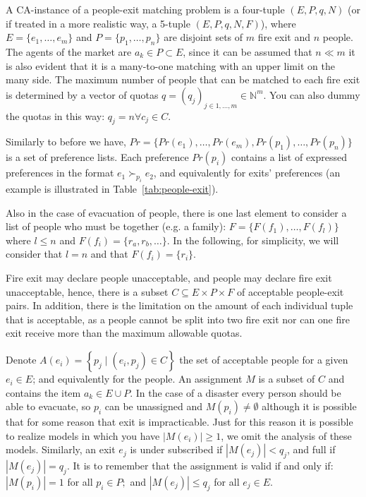 \documentclass[letterpaper]{article} %
\begin{document}
    A CA-instance of a people-exit matching problem is a four-tuple \((E, P, q, N)\)
    (or if treated in a more realistic way, a 5-tuple \((E, P, q, N, F)\)), where
    \(E = \{e_1, \dots, e_m\}\) and \(P = \{p_1, \dots,p_n\}\) are disjoint sets of \(m\) fire exit and \(n\) people.
    The agents of the market are \(a_k \in P\subset E\), since it can be assumed that \(n \ll m\) it is also evident
    that it is a many-to-one matching with an upper limit  on the many side.
    The maximum number of people that can be matched to
    each fire exit is determined by a vector of quotas \(q = (q_j)_{j\in {1,...,m}} \in \mathbb{N}^m\).
    You can also dummy the quotas in this way:  \(q_j = n \forall c_j \in C\).

    Similarly to before we have, \(Pr = \{Pr(e_1), \dots , Pr(e_m), Pr(p_1), \dots , Pr(p_n)\}\) is
    a set of preference lists.
    Each preference \(Pr(p_i)\) contains a list of expressed preferences in the format
    \( e _ { 1 } \succ_{p _ { i }} e _ { 2 } \), and equivalently for exits' preferences (an example is illustrated in Table~\ref{tab:people-exit}).

    Also in the case of evacuation of people, there is one last element to consider a list of people who must be together (e.g. a family):
    \(F=\{F(f_1), \dots, F(f_l)\}\) where \(l\leq n\) and \(F(f_i) = \{r_a, r_b, \dots\}\).
    In the following, for simplicity, we will consider that \(l=n\) and that \(F(f_i)=\{r_i\}\).

    Fire exit may declare people unacceptable, and people may declare fire exit unacceptable,
    hence, there is a subset \(C \subseteq E \times P \times F\) of acceptable people-exit pairs.
    In addition, there is the limitation on the amount of each individual tuple that is acceptable, as a people
    cannot be split into two fire exit nor can one fire exit receive more than the maximum allowable quotas.

    Denote \( A \left( e _ { i } \right) = \left\{ p _ { j } \mid \left( e _ { i } , p _ { j } \right) \in C \right\} \)
    the set of acceptable people for a given \( e _ { i } \in E \); and equivalently for the people.
    An assignment \(M\) is a subset of \(C\) and contains the item \( a _ { k } \in E \cup P \).
    In the case of a disaster every person should be able to evacuate, so  \( p _ { i } \) can be unassigned and
    \( M \left( p _ { i } \right) \neq \emptyset \) although it is possible that for some reason that exit is impracticable.
    Just for this reason it is possible to realize models in which you have \(|M \left( e _ { i } \right)| \geq 1\), we
    omit the analysis of these models.
    Similarly, an exit \( e _ { j } \) is  under subscribed if
    \( \left| M \left( e _ { j } \right) \right| < q _ { j } \), and full if
    \( \left| M \left( e _ { j } \right) \right| = q _ { j } \).
    It is to remember that the assignment is valid if and only if:
    \( \left| M \left( p _ { i } \right) \right| = 1 \) for all \( p _ { i } \in P ; \) and
    \( \left| M \left( e _ { j } \right) \right| \leq q _ { j } \) for all \( e _ { j } \in E  \).
\end{document}
